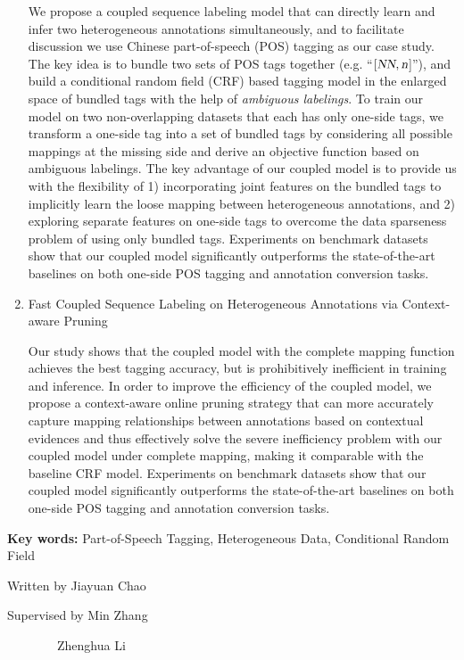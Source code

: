 \begin{eabstract}
\begin{enumerate}
              We propose a coupled sequence labeling model that can directly learn and infer two heterogeneous annotations simultaneously, and to facilitate discussion we use Chinese part-of-speech (POS) tagging as our case study. The key idea is to bundle two sets of POS tags together (e.g. ``$[\textsl{NN},\textsl{n}$]''), and build a conditional random field (CRF) based tagging model in the enlarged space of bundled tags with the help of \emph{ambiguous labelings}. To train our model on two non-overlapping datasets that each has only one-side tags, we transform a one-side tag into a set of bundled tags by considering all possible mappings at the missing side and derive an objective function based on ambiguous labelings. The key advantage of our coupled model is to provide us with the flexibility of 1) incorporating joint features on the bundled tags to implicitly learn the loose mapping between heterogeneous annotations, and 2) exploring separate features on one-side tags to overcome the data sparseness problem of using only bundled tags.
              Experiments on benchmark datasets show that our coupled model significantly outperforms the state-of-the-art baselines on both one-side POS tagging and annotation conversion tasks.

        \item Fast Coupled Sequence Labeling on Heterogeneous Annotations via Context-aware Pruning

              Our study shows that the coupled model with the complete mapping function achieves the best tagging accuracy, but is prohibitively inefficient in training and inference.
              In order to improve the efficiency of the coupled model,
              we propose a context-aware online pruning strategy that can more accurately capture mapping relationships between annotations based on contextual evidences and thus effectively solve the severe inefficiency problem with our coupled model under complete mapping, making it comparable with the baseline CRF model.
              Experiments on benchmark datasets show that our coupled model significantly outperforms the state-of-the-art baselines on both one-side POS tagging and annotation conversion tasks.
    \end{enumerate}

    \vskip 21bp
        {\bf{} Key words: } Part-of-Speech Tagging, Heterogeneous Data, Conditional Random Field
\end{eabstract}

\begin{flushright}
    Written by Jiayuan Chao

    Supervised by Min Zhang

    ~~~~~~~~Zhenghua Li
\end{flushright}
